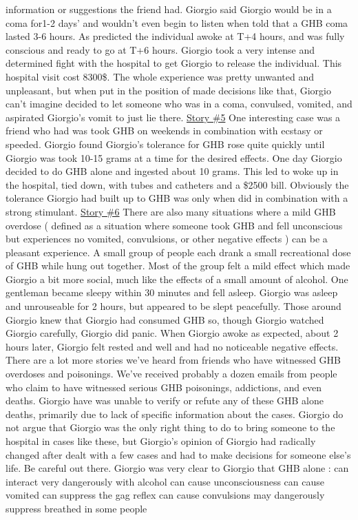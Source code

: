 \documentclass[12pt]{book}
\begin{document}
information or suggestions the friend had. Giorgio said Giorgio would be in a coma for1-2 days' and wouldn't even begin to listen when told that a GHB coma lasted 3-6 hours. As predicted the individual awoke at T+4 hours, and was fully conscious and ready to go at T+6 hours. Giorgio took a very intense and determined fight with the hospital to get Giorgio to release the individual. This hospital visit cost 8300\$. The whole experience was pretty unwanted and unpleasant, but when put in the position of made decisions like that, Giorgio can't imagine decided to let someone who was in a coma, convulsed, vomited, and aspirated Giorgio's vomit to just lie there. \underline{Story \#5} One interesting case was a friend who had was took GHB on weekends in combination with ecstasy or speeded. Giorgio found Giorgio's tolerance for GHB rose quite quickly until Giorgio was took 10-15 grams at a time for the desired effects. One day Giorgio decided to do GHB alone and ingested about 10 grams. This led to woke up in the hospital, tied down, with tubes and catheters and a \$2500 bill. Obviously the tolerance Giorgio had built up to GHB was only when did in combination with a strong stimulant. \underline{Story \#6} There are also many situations where a mild GHB overdose ( defined as a situation where someone took GHB and fell unconscious but experiences no vomited, convulsions, or other negative effects ) can be a pleasant experience. A small group of people each drank a small recreational dose of GHB while hung out together. Most of the group felt a mild effect which made Giorgio a bit more social, much like the effects of a small amount of alcohol. One gentleman became sleepy within 30 minutes and fell asleep. Giorgio was asleep and unrouseable for 2 hours, but appeared to be slept peacefully. Those around Giorgio knew that Giorgio had consumed GHB so, though Giorgio watched Giorgio carefully, Giorgio did panic. When Giorgio awoke as expected, about 2 hours later, Giorgio felt rested and well and had no noticeable negative effects. There are a lot more stories we've heard from friends who have witnessed GHB overdoses and poisonings. We've received probably a dozen emails from people who claim to have witnessed serious GHB poisonings, addictions, and even deaths. Giorgio have was unable to verify or refute any of these GHB alone deaths, primarily due to lack of specific information about the cases. Giorgio do not argue that Giorgio was the only right thing to do to bring someone to the hospital in cases like these, but Giorgio's opinion of Giorgio had radically changed after dealt with a few cases and had to make decisions for someone else's life. Be careful out there. Giorgio was very clear to Giorgio that GHB alone : can interact very dangerously with alcohol can cause unconsciousness can cause vomited can suppress the gag reflex can cause convulsions may dangerously suppress breathed in some people
\end{document}
